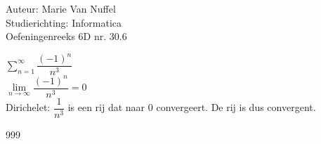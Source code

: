 \documentclass[a4paper]{article}
\newcommand{\llim}{\lim\limits}
\begin{document}
  
\noindent \large Auteur: Marie Van Nuffel \\
\noindent \large Studierichting: Informatica\\
\noindent \large Oefeningenreeks 6D nr. 30.6\\

\medskip

\normalsize

$\displaystyle\sum_{n=1}^{\infty}\dfrac{(-1)^n}{n^3}$\\

$\llim_{n\rightarrow \infty}\dfrac{(-1)^n}{n^3} = 0$\\

Dirichelet:
$\dfrac{1}{n^3}$ is een rij dat naar 0 convergeert.
De rij is dus convergent.

			


\begin{thebibliography}{999}
\end{thebibliography}
\end{document}
